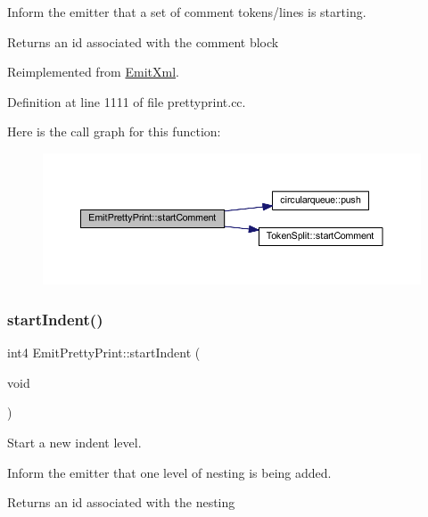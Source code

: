 Inform the emitter that a set of comment tokens/lines is starting. \begin{DoxyReturn}{Returns}
an id associated with the comment block 
\end{DoxyReturn}


Reimplemented from \mbox{\hyperlink{class_emit_xml_a4b5198be36bbd5b170206affef1d21d0}{Emit\+Xml}}.



Definition at line 1111 of file prettyprint.\+cc.

Here is the call graph for this function\+:
\nopagebreak
\begin{figure}[H]
\begin{center}
\leavevmode
\includegraphics[width=350pt]{class_emit_pretty_print_a922f3833eb9fd5f0aa04f2d0fe3e3540_cgraph}
\end{center}
\end{figure}
\mbox{\label{class_emit_pretty_print_a3c08c45b256a71e9e93864dd7ef4860b}} 
\subsubsection{\texorpdfstring{startIndent()}{startIndent()}}
{\footnotesize\ttfamily int4 Emit\+Pretty\+Print\+::start\+Indent (\begin{DoxyParamCaption}\item[{void}]{ }\end{DoxyParamCaption})\hspace{0.3cm}{\ttfamily [virtual]}}



Start a new indent level. 

Inform the emitter that one level of nesting is being added. \begin{DoxyReturn}{Returns}
an id associated with the nesting 
\end{DoxyReturn}


